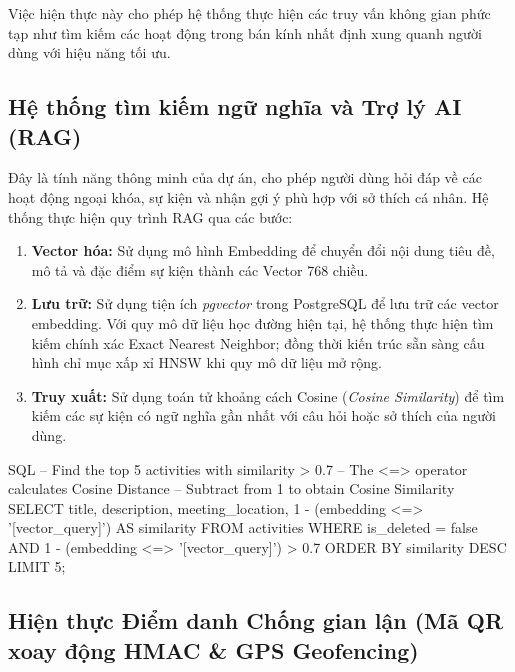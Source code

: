 Việc hiện thực này cho phép hệ thống thực hiện các truy vấn không gian phức tạp như tìm kiếm các hoạt động trong bán kính nhất định xung quanh người dùng với hiệu năng tối ưu.

\subsection{Hệ thống tìm kiếm ngữ nghĩa và Trợ lý AI (RAG)}
Đây là tính năng thông minh của dự án, cho phép người dùng hỏi đáp về các hoạt động ngoại khóa, sự kiện và nhận gợi ý phù hợp với sở thích cá nhân. Hệ thống thực hiện quy trình RAG qua các bước:
\begin{enumerate}[leftmargin=*]
    \item \textbf{Vector hóa:} Sử dụng mô hình Embedding để chuyển đổi nội dung tiêu đề, mô tả và đặc điểm sự kiện thành các Vector 768 chiều.
    \item \textbf{Lưu trữ:} Sử dụng tiện ích \textit{pgvector} trong PostgreSQL để lưu trữ các vector embedding. Với quy mô dữ liệu học đường hiện tại, hệ thống thực hiện tìm kiếm chính xác Exact Nearest Neighbor; đồng thời kiến trúc sẵn sàng cấu hình chỉ mục xấp xỉ HNSW khi quy mô dữ liệu mở rộng.
    \item \textbf{Truy xuất:} Sử dụng toán tử khoảng cách Cosine (\textit{Cosine Similarity}) để tìm kiếm các sự kiện có ngữ nghĩa gần nhất với câu hỏi hoặc sở thích của người dùng.
\end{enumerate}

\begin{mycode}{SQL}
-- Find the top 5 activities with similarity > 0.7
-- The <=> operator calculates Cosine Distance
-- Subtract from 1 to obtain Cosine Similarity
SELECT 
    title, description, meeting_location,
    1 - (embedding <=> '[vector_query]') AS similarity
FROM activities
WHERE is_deleted = false AND 1 - (embedding <=> '[vector_query]') > 0.7
ORDER BY similarity DESC 
LIMIT 5;
\end{mycode}

\subsection{Hiện thực Điểm danh Chống gian lận (Mã QR xoay động HMAC \& GPS Geofencing)}

